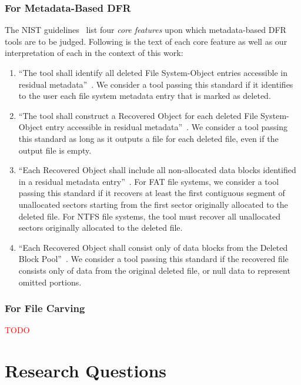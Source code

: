 \documentclass{ws-rv9x6}
\newcommand{\TODO}[1]{\textcolor{red}{#1}} %
\newenvironment{paraphrase}{\color{blue}}{\color{black}} %
\begin{document}
\subsubsection{For Metadata-Based DFR}
\begin{paraphrase}
 The NIST guidelines~\cite{meta:dfr:standards} list four \emph{core features} upon which metadata-based DFR tools are to be judged.
Following is the text of each core feature as well as our interpretation of each in the context of this work:
\begin{enumerate}
 \item ``The tool shall identify all deleted File System-Object entries accessible in residual metadata''~\cite{meta:dfr:standards}.
 We consider a tool passing this standard if it identifies to the user each file system metadata entry that is marked as deleted.
 \item ``The tool shall construct a Recovered Object for each deleted File System-Object entry accessible in residual metadata''~\cite{meta:dfr:standards}.
 We consider a tool passing this standard as long as it outputs a file for each deleted file, even if the output file is empty.
 \item ``Each Recovered Object shall include all non-allocated data blocks identified in a residual metadata entry''~\cite{meta:dfr:standards}.
 For FAT file systems, we consider a tool passing this standard if it recovers at least the first contiguous segment of unallocated sectors starting 
from the first sector originally allocated to the deleted file. For NTFS file systems, the tool must recover all unallocated sectors originally allocated to the deleted file.
 \item ``Each Recovered Object shall consist only of data blocks from the Deleted Block Pool''~\cite{meta:dfr:standards}.
 We consider a tool passing this standard if the recovered file consists only of data from the original deleted file, or null data to represent omitted portions.
\end{enumerate}
\end{paraphrase}

\subsubsection{For File Carving}

\TODO{TODO}

\section{Research Questions}
\end{document}

